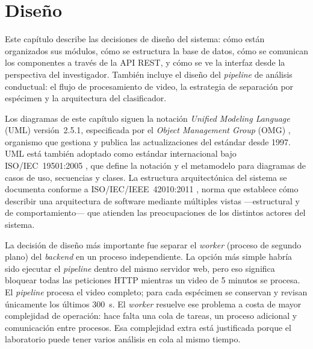 
\chapter{Diseño}

Este capítulo describe las decisiones de diseño del sistema: cómo están organizados
sus módulos, cómo se estructura la base de datos, cómo se comunican los componentes
a través de la API REST, y cómo se ve la interfaz desde la perspectiva del investigador.
También incluye el diseño del \textit{pipeline} de análisis conductual: el flujo de procesamiento
de video, la estrategia de separación por espécimen y la arquitectura del clasificador.

Los diagramas de este capítulo siguen la notación \textit{Unified Modeling Language}
(UML) versión~2.5.1, especificada por el \textit{Object Management Group}
(OMG) \cite{omg_uml}, organismo que gestiona y publica las actualizaciones del
estándar desde 1997. UML está también adoptado como estándar internacional bajo
ISO/IEC~19501:2005 \cite{iso19501}, que define la notación y el metamodelo para
diagramas de casos de uso, secuencias y clases. La estructura arquitectónica del
sistema se documenta conforme a ISO/IEC/IEEE~42010:2011 \cite{iso42010}, norma que
establece cómo describir una arquitectura de software mediante múltiples vistas
---estructural y de comportamiento--- que atienden las preocupaciones
de los distintos actores del sistema.

La decisión de diseño más importante fue separar el \textit{worker} (proceso de segundo
plano) del \textit{backend} en un proceso independiente. La opción más simple habría sido ejecutar el \textit{pipeline} dentro del mismo
servidor web, pero eso significa bloquear todas las peticiones HTTP mientras un video
de 5 minutos se procesa. El \textit{pipeline} procesa el video completo; para cada espécimen se conservan y revisan únicamente los últimos 300~s. El \textit{worker} resuelve ese problema a costa de mayor complejidad
de operación: hace falta una cola de tareas, un proceso adicional y comunicación
entre procesos. Esa complejidad extra está justificada porque el laboratorio puede
tener varios análisis en cola al mismo tiempo.

